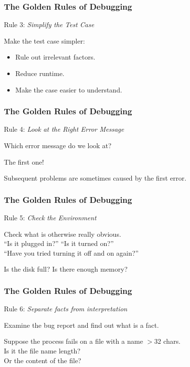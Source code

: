 \begin{frame}
\frametitle{The Golden Rules of Debugging}
\begin{changemargin}{1cm}

Rule 3: \emph{Simplify the Test Case}

Make the test case simpler:

\begin{itemize}
	\item Rule out irrelevant factors.
	\item Reduce runtime.
	\item Make the case easier to understand.
\end{itemize}

\end{changemargin}
\end{frame}

\begin{frame}
\frametitle{The Golden Rules of Debugging}
\begin{changemargin}{1cm}

Rule 4: \emph{Look at the Right Error Message}

Which error message do we look at?

The first one!

Subsequent problems are sometimes caused by the first error.

\end{changemargin}
\end{frame}

\begin{frame}
\frametitle{The Golden Rules of Debugging}
\begin{changemargin}{1cm}

Rule 5: \emph{Check the Environment}

Check what is otherwise really obvious.\\
\quad ``Is it plugged in?'' ``Is it turned on?''\\
\quad ``Have you tried turning it off and on again?''

Is the disk full? Is there enough memory? 

\end{changemargin}
\end{frame}


\begin{frame}
\frametitle{The Golden Rules of Debugging}
\begin{changemargin}{1cm}

Rule 6: \emph{Separate facts from interpretation}

Examine the bug report and find out what is a fact.

Suppose the process fails on a file with a name $>32$ chars.\\
\quad Is it the file name length?\\
\quad Or the content of the file?

\end{changemargin}
\end{frame}

